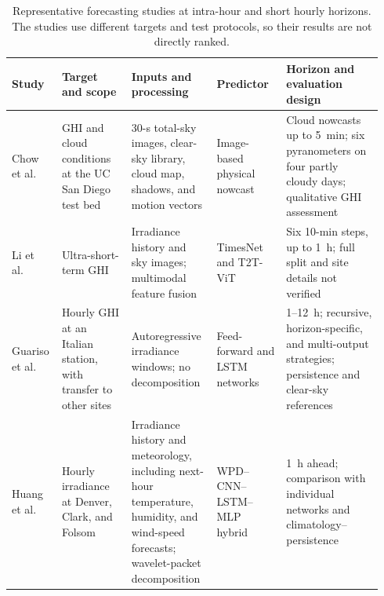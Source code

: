\begin{table}[!htbp]
\centering
\caption{Representative forecasting studies at intra-hour and short
hourly horizons. The studies use different targets and test protocols, so
their results are not directly ranked.}
\label{tab:literature_review}
\label{tab:literature_review_short}
\scriptsize
\setlength{\tabcolsep}{2.5pt}
\renewcommand{\arraystretch}{1.12}
\begin{tabular}{@{}p{0.11\linewidth}p{0.18\linewidth}p{0.22\linewidth}p{0.18\linewidth}p{0.25\linewidth}@{}}
\toprule
\textbf{Study} & \textbf{Target and scope} & \textbf{Inputs and processing} &
\textbf{Predictor} & \textbf{Horizon and evaluation design} \\
\midrule
Chow et al.\ \cite{chow2011} &
GHI and cloud conditions at the UC San Diego test bed &
30-s total-sky images, clear-sky library, cloud map, shadows, and motion vectors &
Image-based physical nowcast &
Cloud nowcasts up to 5~min; six pyranometers on four partly cloudy days; qualitative GHI assessment \\

Li et al.\ \cite{li2025timesnet} &
Ultra-short-term GHI &
Irradiance history and sky images; multimodal feature fusion &
TimesNet and T2T-ViT &
Six 10-min steps, up to 1~h; full split and site details not verified \\

Guariso et al.\ \cite{guariso2020} &
Hourly GHI at an Italian station, with transfer to other sites &
Autoregressive irradiance windows; no decomposition &
Feed-forward and LSTM networks &
1--12~h; recursive, horizon-specific, and multi-output strategies; persistence and clear-sky references \\

Huang et al.\ \cite{huang2021} &
Hourly irradiance at Denver, Clark, and Folsom &
Irradiance history and meteorology, including next-hour temperature, humidity, and wind-speed forecasts; wavelet-packet decomposition &
WPD--CNN--LSTM--MLP hybrid &
1~h ahead; comparison with individual networks and climatology--persistence \\
\bottomrule
\end{tabular}
\end{table}

